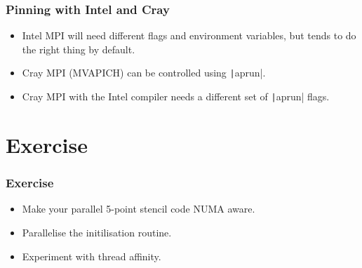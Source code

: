 \documentclass{beamer}
\begin{document}
\begin{frame}
\frametitle{Pinning with Intel and Cray}
\begin{itemize}
  \item Intel MPI will need different flags and environment variables, but tends to do the right thing by default.
  \item Cray MPI (MVAPICH) can be controlled using \texttt|aprun|.
  \item Cray MPI with the Intel compiler needs a different set of \texttt|aprun| flags.
\end{itemize}
\end{frame}

\section{Exercise}
\begin{frame}
\frametitle{Exercise}
\begin{itemize}
  \item Make your parallel 5-point stencil code NUMA aware.
  \item Parallelise the initilisation routine.
  \item Experiment with thread affinity.
\end{itemize}
\end{frame}

\end{document}
